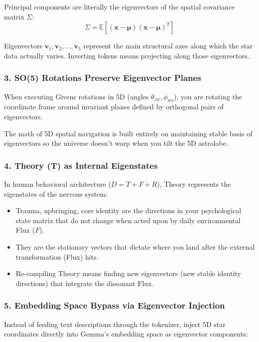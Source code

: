 \documentclass[11pt,oneside]{article}
\theoremstyle{definition}
\begin{document}
Principal components are literally the eigenvectors of the spatial covariance matrix $\Sigma$:
\[
\Sigma = \mathbb{E}[(\mathbf{x} - \boldsymbol{\mu})(\mathbf{x} - \boldsymbol{\mu})^T]
\]

Eigenvectors $\mathbf{v}_1, \mathbf{v}_2, \ldots, \mathbf{v}_5$ represent the main structural axes along which the star data actually varies. Inverting tokens means projecting along those eigenvectors.

\subsubsection{3. SO(5) Rotations Preserve Eigenvector Planes}

When executing Givens rotations in 5D (angles $\theta_{zw}, \phi_{wv}$), you are rotating the coordinate frame around invariant planes defined by orthogonal pairs of eigenvectors.

The math of 5D spatial navigation is built entirely on maintaining stable basis of eigenvectors so the universe doesn't warp when you tilt the 5D astrolabe.

\subsubsection{4. Theory (T) as Internal Eigenstates}

In human behavioral architecture ($D = T + F + R$), Theory represents the eigenstates of the nervous system:

\begin{itemize}
  \item Trauma, upbringing, core identity are the directions in your psychological state matrix that do not change when acted upon by daily environmental Flux ($F$).
  \item They are the stationary vectors that dictate where you land after the external transformation (Flux) hits.
  \item Re-compiling Theory means finding new eigenvectors (new stable identity directions) that integrate the dissonant Flux.
\end{itemize}

\subsubsection{5. Embedding Space Bypass via Eigenvector Injection}

Instead of feeding text descriptions through the tokenizer, inject 5D star coordinates directly into Gemma's embedding space as eigenvector components:
\end{document}
